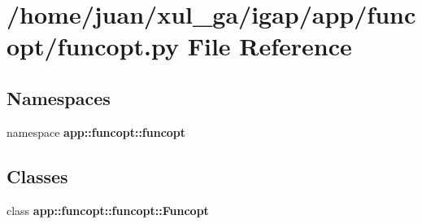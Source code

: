 \section{/home/juan/xul\_\-ga/igap/app/funcopt/funcopt.py File Reference}
\label{funcopt_8py}
\subsection*{Namespaces}
\begin{CompactItemize}
\item 
namespace {\bf app::funcopt::funcopt}
\end{CompactItemize}
\subsection*{Classes}
\begin{CompactItemize}
\item 
class {\bf app::funcopt::funcopt::Funcopt}
\end{CompactItemize}
